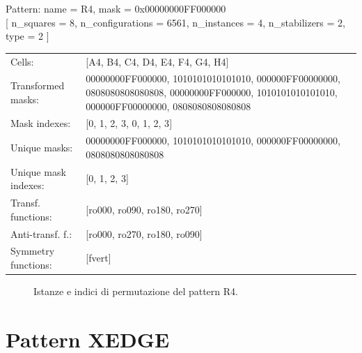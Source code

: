\begin{tcolorbox}[sharp corners, fontupper=\ttfamily\small, colback=white]
  \noindent Pattern: name = R4, mask = 0x00000000FF000000\\
  {[} n\_squares = 8, n\_configurations = 6561,
  n\_instances = 4, n\_stabilizers = 2, type = 2 { ]}\\[1.0ex]
  \begin{tabularx}{\textwidth}{@{} p{3.5cm} X @{}}
    Cells:               & {[}A4, B4, C4, D4, E4, F4, G4, H4{]}\\[0.5ex]
    Transformed masks:   & 00000000FF000000, 1010101010101010, 000000FF00000000, 0808080808080808, 00000000FF000000, 1010101010101010, 000000FF00000000, 0808080808080808\\[0.5ex]
    Mask indexes:        & {[}0, 1, 2, 3, 0, 1, 2, 3{]}\\[0.5ex]
    Unique masks:        & 00000000FF000000, 1010101010101010, 000000FF00000000, 0808080808080808\\[0.5ex]
    Unique mask indexes: & {[}0, 1, 2, 3{]}\\[0.5ex]
    Transf. functions:   & {[}ro000, ro090, ro180, ro270{]}\\[0.5ex]
    Anti-transf. f.:     & {[}ro000, ro270, ro180, ro090{]}\\[0.5ex]
    Symmetry functions:  & {[}fvert{]}\\[0.5ex]
  \end{tabularx}
\end{tcolorbox}

\begin{figure}[htbp]
  \centering
   \hfill
   \hfill
   \hfill
  \vspace{0.3cm}
   \hfill
   \hfill
   \hfill
  \caption{Istanze e indici di permutazione del pattern R4.}
\end{figure}

\newpage

\section{Pattern XEDGE}

